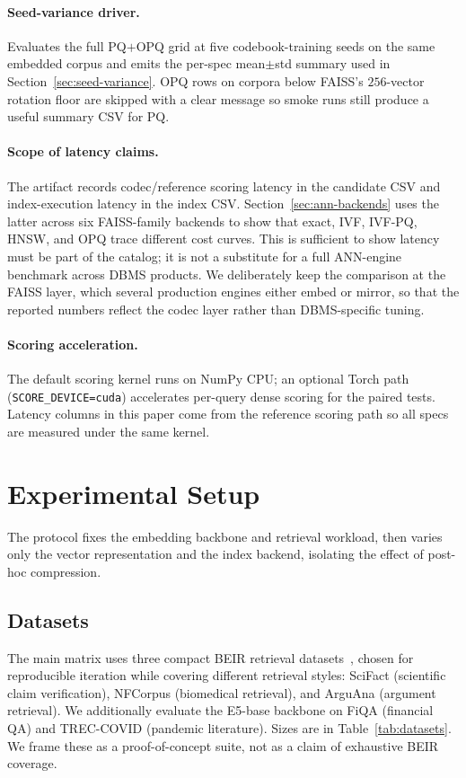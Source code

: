 \documentclass[sigconf]{acmart}
\begin{document}
\paragraph{Seed-variance driver.}
Evaluates the full PQ$+$OPQ grid at five codebook-training seeds on the same embedded corpus and emits the per-spec mean$\pm$std summary used in Section~\ref{sec:seed-variance}. OPQ rows on corpora below FAISS's $256$-vector rotation floor are skipped with a clear message so smoke runs still produce a useful summary CSV for PQ.

\paragraph{Scope of latency claims.}
The artifact records codec/reference scoring latency in the candidate CSV and index-execution latency in the index CSV. Section~\ref{sec:ann-backends} uses the latter across six FAISS-family backends to show that exact, IVF, IVF-PQ, HNSW, and OPQ trace different cost curves. This is sufficient to show latency must be part of the catalog; it is not a substitute for a full ANN-engine benchmark across DBMS products. We deliberately keep the comparison at the FAISS layer, which several production engines either embed or mirror, so that the reported numbers reflect the codec layer rather than DBMS-specific tuning.

\paragraph{Scoring acceleration.}
The default scoring kernel runs on NumPy CPU; an optional Torch path (\texttt{SCORE\_DEVICE=cuda}) accelerates per-query dense scoring for the paired tests. Latency columns in this paper come from the reference scoring path so all specs are measured under the same kernel.

\section{Experimental Setup}
\label{sec:setup}

The protocol fixes the embedding backbone and retrieval workload, then varies only the vector representation and the index backend, isolating the effect of post-hoc compression.

\subsection{Datasets}
The main matrix uses three compact BEIR retrieval datasets~\cite{thakur2021beir}, chosen for reproducible iteration while covering different retrieval styles: SciFact (scientific claim verification), NFCorpus (biomedical retrieval), and ArguAna (argument retrieval). We additionally evaluate the E5-base backbone on FiQA (financial QA) and TREC-COVID (pandemic literature). Sizes are in Table~\ref{tab:datasets}. We frame these as a proof-of-concept suite, not as a claim of exhaustive BEIR coverage.
\end{document}
